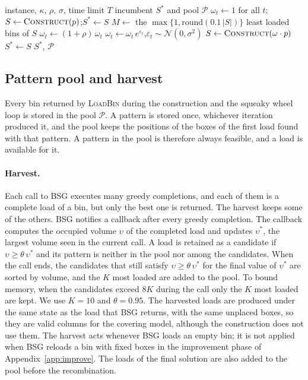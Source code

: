 \begin{algorithm}[t]
\caption{Squeaky wheel optimisation}
\label{alg:swo}
\begin{algorithmic}[1]
\Require instance, $\kappa$, $\rho$, $\sigma$, time limit $T$
\Ensure incumbent $S^*$ and pool $\mathcal{P}$
\State $\omega_t\gets 1$ for all $t$;\quad $S\gets \textsc{Construct}(p)$;\quad $S^*\gets S$
  \State $M\gets$ the $\max\{1,\mathrm{round}(0.1\,|S|)\}$ least loaded bins of $S$
     $\omega_t\gets(1+\rho)\,\omega_t$ \EndIf
    \State $\omega_t\gets \omega_t\,e^{\varepsilon_t}$,\quad $\varepsilon_t\sim\mathcal{N}(0,\sigma^2)$
  \EndFor
  \State $S\gets \textsc{Construct}(\omega\cdot p)$
   $S^*\gets S$ \EndIf
\EndWhile
\State \Return $S^*$, $\mathcal{P}$
\end{algorithmic}
\end{algorithm}

\subsection{Pattern pool and harvest}
\label{sec:m-pool}

Every bin returned by \textsc{LoadBin} during the construction and the squeaky wheel loop is
stored in the pool $\mathcal{P}$. A pattern is stored once, whichever iteration produced it, and
the pool keeps the positions of the boxes of the first load found with that pattern. A pattern
in the pool is therefore always feasible, and a load is available for it.

\paragraph{Harvest.}
Each call to BSG executes many greedy completions, and each of them is a complete load of a bin,
but only the best one is returned. The harvest keeps some of the others. BSG notifies a callback
after every greedy completion. The callback computes the occupied volume $\upsilon$ of the
completed load and updates $\upsilon^*$, the largest volume seen in the current call. A load is
retained as a candidate if $\upsilon\ge\theta\,\upsilon^*$ and its pattern is neither in the pool
nor among the candidates. When the call ends, the candidates that still satisfy
$\upsilon\ge\theta\,\upsilon^*$ for the final value of $\upsilon^*$ are sorted by volume, and the
$K$ most loaded are added to the pool. To bound memory, when the candidates exceed $8K$ during the
call only the $K$ most loaded are kept. We use $K=10$ and $\theta=0.95$. The harvested loads are produced under the same state as
the load that BSG returns, with the same unplaced boxes, so they are valid columns for the covering
model, although the construction does not use them. The harvest acts whenever BSG loads an empty bin; it is not applied when BSG reloads a bin with
fixed boxes in the improvement phase of Appendix~\ref{app:improve}. The loads of the final solution are also added to the pool before the recombination.

